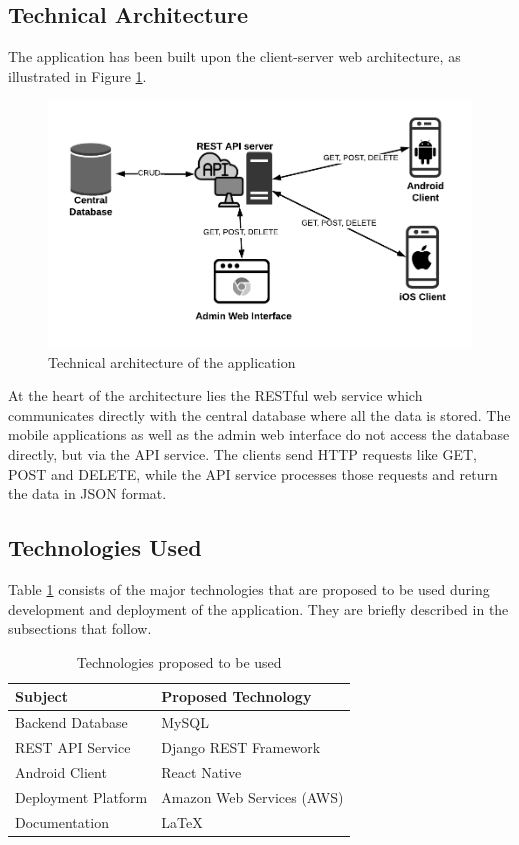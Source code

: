 \documentclass[12pt, a4paper, oneside]{article}
\begin{document}
\subsection{Technical Architecture}
The application has been built upon the client-server web architecture, as illustrated in Figure \ref{fig:arch}.

\begin{figure}[h]
\includegraphics[width=\linewidth]{architecture}
\centering
\caption{Technical architecture of the application}
\label{fig:arch}
\end{figure}

At the heart of the architecture lies the RESTful web service which communicates directly with the central database where all the data is stored. The mobile applications as well as the admin web interface do not access the database directly, but via the API service. The clients send HTTP requests like GET, POST and DELETE, while the API service processes those requests and return the data in JSON format.

\subsection{Technologies Used}
Table \ref{table:tech} consists of the major technologies that are proposed to be used during development and deployment of the application. They are briefly described in the subsections that follow.

\renewcommand{\arraystretch}{1.5}
\begin{table}[]
\begin{tabular}{|l|l|}
\hline
\rowcolor[HTML]{C0C0C0} 
\textbf{Subject}    & \textbf{Proposed Technology} \\ \hline
Backend Database            & MySQL                        \\ \hline
REST API Service    & Django REST Framework        \\ \hline
Android Client  & React Native                 \\ \hline
Deployment Platform & Amazon Web Services (AWS)    \\ \hline
Documentation & LaTeX \\ \hline
\end{tabular}
\caption{Technologies proposed to be used}
\label{table:tech}
\end{table}
\end{document}
